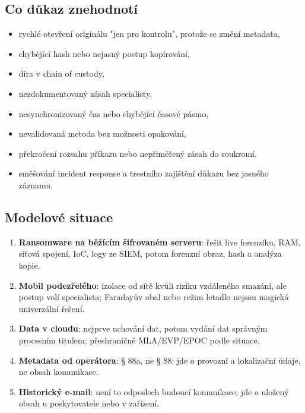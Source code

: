 \documentclass[11pt,a4paper]{article}
\begin{document}
\subsection*{Co důkaz znehodnotí}
\begin{itemize}
  \item rychlé otevření originálu "jen pro kontrolu", protože se změní metadata,
  \item chybějící hash nebo nejasný postup kopírování,
  \item díra v chain of custody,
  \item nezdokumentovaný zásah specialisty,
  \item nesynchronizovaný čas nebo chybějící časové pásmo,
  \item nevalidovaná metoda bez možnosti opakování,
  \item překročení rozsahu příkazu nebo nepřiměřený zásah do soukromí,
  \item směšování incident response a trestního zajištění důkazu bez jasného záznamu.
\end{itemize}

\subsection*{Modelové situace}
\begin{enumerate}
  \item \textbf{Ransomware na běžícím šifrovaném serveru}: řešit live forenziku, RAM, síťová spojení, IoC, logy ze SIEM, potom forenzní obraz, hash a analýza kopie.
  \item \textbf{Mobil podezřelého}: izolace od sítě kvůli riziku vzdáleného smazání, ale postup volí specialista; Faradayův obal nebo režim letadlo nejsou magická univerzální řešení.
  \item \textbf{Data v cloudu}: nejprve uchování dat, potom vydání dat správným procesním titulem; přeshraničně MLA/EVP/EPOC podle situace.
  \item \textbf{Metadata od operátora}: § 88a, ne § 88; jde o provozní a lokalizační údaje, ne obsah komunikace.
  \item \textbf{Historický e-mail}: není to odposlech budoucí komunikace; jde o uložený obsah u poskytovatele nebo v zařízení.
\end{enumerate}
\end{document}
